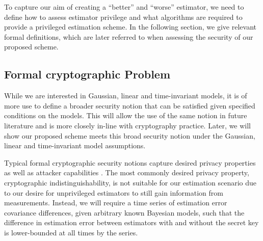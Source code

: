 \documentclass[conference]{IEEEtran}
\theoremstyle{definition}
\theoremstyle{definition}
\theoremstyle{remark}
\begin{document}
To capture our aim of creating a ``better'' and ``worse'' estimator, we need to define how to assess estimator privilege and what algorithms are required to provide a privileged estimation scheme. In the following section, we give relevant formal definitions, which are later referred to when assessing the security of our proposed scheme.

% 
% 

\subsection{Formal cryptographic Problem}\label{subsec:crypto_problem}
While we are interested in Gaussian, linear and time-invariant models, it is of more use to define a broader security notion that can be satisfied given specified conditions on the models. This will allow the use of the same notion in future literature and is more closely in-line with cryptography practice. Later, we will show our proposed scheme meets this broad security notion under the Gaussian, linear and time-invariant model assumptions.

Typical formal cryptographic security notions capture desired privacy properties as well as attacker capabilities \cite{katzIntroductionModernCryptography2008}. The most commonly desired privacy property, cryptographic indistinguishability, is not suitable for our estimation scenario due to our desire for unprivileged estimators to still gain  information from measurements. Instead, we will require a time series of estimation error covariance differences, given arbitrary known Bayesian models, such that the difference in estimation error between estimators with and without the secret key is lower-bounded at all times by the series.
\end{document}
